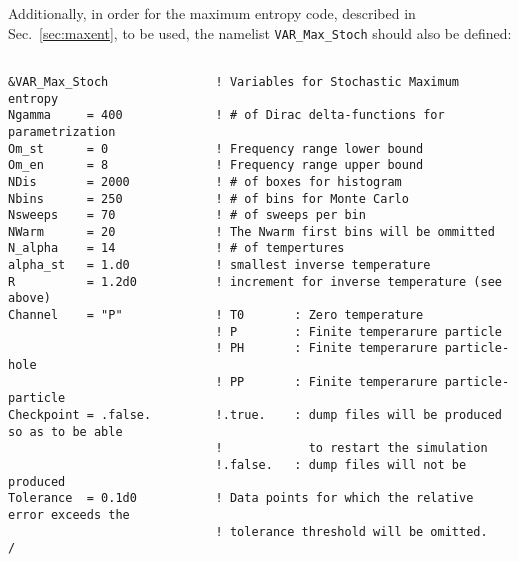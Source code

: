 Additionally, in order for the maximum entropy code, described in Sec.~\ref{sec:maxent}, to be used, the namelist \texttt{VAR\_Max\_Stoch} should also be defined:
\begin{lstlisting}[style=fortran]

&VAR_Max_Stoch               ! Variables for Stochastic Maximum entropy
Ngamma     = 400             ! # of Dirac delta-functions for parametrization
Om_st      = 0               ! Frequency range lower bound
Om_en      = 8               ! Frequency range upper bound
NDis       = 2000            ! # of boxes for histogram
Nbins      = 250             ! # of bins for Monte Carlo
Nsweeps    = 70              ! # of sweeps per bin
NWarm      = 20              ! The Nwarm first bins will be ommitted
N_alpha    = 14              ! # of tempertures
alpha_st   = 1.d0            ! smallest inverse temperature
R          = 1.2d0           ! increment for inverse temperature (see above) 
Channel    = "P"             ! T0       : Zero temperature
                             ! P        : Finite temperarure particle 
                             ! PH       : Finite temperarure particle-hole
                             ! PP       : Finite temperarure particle-particle 
Checkpoint = .false.         !.true.    : dump files will be produced so as to be able
                             !            to restart the simulation
                             !.false.   : dump files will not be produced 
Tolerance  = 0.1d0           ! Data points for which the relative error exceeds the
                             ! tolerance threshold will be omitted.
/
\end{lstlisting}


